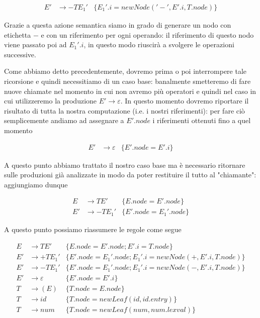 \documentclass[class=book, crop=false, oneside, 12pt]{standalone}
\begin{document}
\begin{align*}
    E' &\to -TE_{1}' &\{E_{1}'.i = newNode('-', E'.i, T.node)\}
\end{align*}

Grazie a questa azione semantica siamo in grado di generare un nodo con etichetta \(-\) e con un riferimento per ogni operando: il riferimento di questo nodo viene passato poi ad \(E_1'.i\), in questo modo riuscirà a svolgere le operazioni successive. 

Come abbiamo detto precedentemente, dovremo prima o poi interrompere tale ricorsione e quindi necessitiamo di un caso base: banalmente smetteremo di fare nuove chiamate nel momento in cui non avremo più operatori e quindi nel caso in cui utilizzeremo la produzione \(E' \to \varepsilon\). In questo momento dovremo riportare il risultato di tutta la nostra computazione (i.e. i nostri riferimenti): per fare ciò semplicemente andiamo ad assegnare a \(E'.node\) i riferimenti ottenuti fino a quel momento

\begin{align*}
     E' &\to \varepsilon &\{E'.node = E'.i\}
\end{align*}

A questo punto abbiamo trattato il nostro caso base ma è necessario ritornare sulle produzioni già analizzate in modo da poter restituire il tutto al "chiamante": aggiungiamo dunque   

\begin{align*}
    E &\to TE' &\{E.node = E'.node\} \\
    E' &\to -TE_{1}' &\{E'.node = E_{1}'.node\}
\end{align*}

A questo punto possiamo riassumere le regole come segue

\begin{align*}
    E &\to TE' &\{E.node = E'.node; E'.i = T.node\} \\
    E' &\to +TE_{1}' &\{E'.node = E_{1}'.node; E_{1}'.i = newNode(+, E'.i, T.node)\} \\
    E' &\to -TE_{1}' &\{E'.node = E_{1}'.node; E_{1}'.i = newNode(-, E'.i, T.node)\} \\
    E' &\to \varepsilon &\{E'.node = E'.i\} \\
    T &\to (E) &\{T.node = E.node\} \\
    T &\to id &\{T.node = newLeaf(id, id.entry)\} \\
    T &\to num &\{T.node = newLeaf(num, num.lexval)\}
\end{align*}
\end{document}

